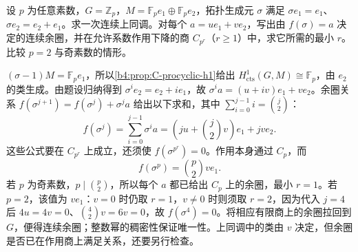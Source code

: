 \begin{exercise}\label{b4:ex:C-unipotent-cochain-level}
	设 \(p\) 为任意素数，\(G=\mathbb Z_p\)，\(M=\mathbb F_p e_1\oplus\mathbb F_p e_2\)，拓扑生成元 \(\sigma\) 满足 \(\sigma e_1=e_1\)、\(\sigma e_2=e_2+e_1\)。求一次连续上同调。对每个 \(a=u e_1+v e_2\)，写出由 \(f(\sigma)=a\) 决定的连续余圈，并在允许系数作用下降的商 \(C_{p^r}\)（\(r\ge1\)）中，求它所需的最小 \(r\)。比较 \(p=2\) 与奇素数的情形。
\end{exercise}
\begin{solution}
	\((\sigma-1)M=\mathbb F_p e_1\)，所以\cref{b4:prop:C-procyclic-h1}给出 \(H^1_{\mathrm{cts}}(G,M)\cong\mathbb F_p\)，由 \(e_2\) 的类生成。由题设归纳得到 \(\sigma^ie_2=e_2+ie_1\)，故 \(\sigma^ia=(u+iv)e_1+ve_2\)。余圈关系 \(f(\sigma^{j+1})=f(\sigma^j)+\sigma^ja\) 给出以下求和，其中 \(\sum_{i=0}^{j-1}i=\binom j2\)：
	\[
		f(\sigma^j)=\sum_{i=0}^{j-1}\sigma^i a =\left(ju+\binom j2v\right)e_1+jv e_2.
	\]
	这些公式要在 \(C_{p^r}\) 上成立，还须使 \(f(\sigma^{p^r})=0\)。作用本身通过 \(C_p\)，而
	\[
		f(\sigma^p)=\binom p2v e_1.
	\]
	若 \(p\) 为奇素数，\(p\mid\binom p2\)，所以每个 \(a\) 都已给出 \(C_p\) 上的余圈，最小 \(r=1\)。若 \(p=2\)，该值为 \(v e_1\)：\(v=0\) 时仍取 \(r=1\)，\(v\ne0\) 时则须取 \(r=2\)，因为代入 \(j=4\) 后 \(4u=4v=0\)、\(\binom42v=6v=0\)，故 \(f(\sigma^4)=0\)。将相应有限商上的余圈拉回到 \(G\)，便得连续余圈；整数幂的稠密性保证唯一性。上同调中的类由 \(v\) 决定，但余圈是否已在作用商上满足关系，还要另行检查。
\end{solution}

